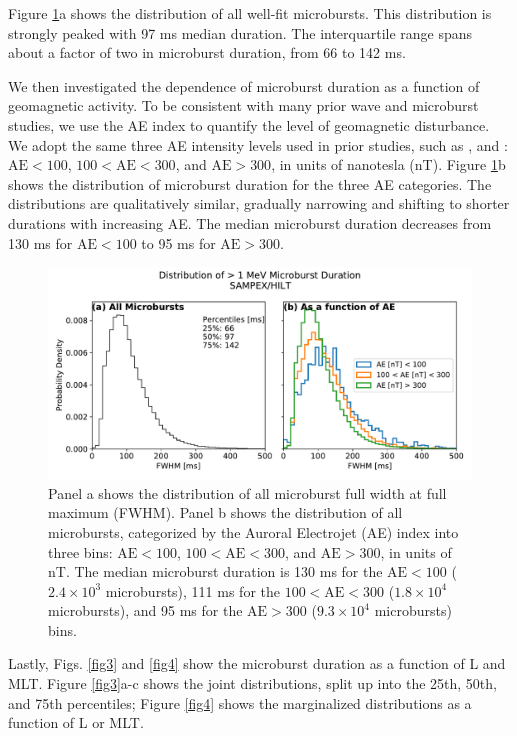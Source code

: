 \documentclass[draft]{agujournal2019}
\begin{document}
Figure \ref{fig2}a shows the distribution of all well-fit microbursts. This distribution is strongly peaked with 97 ms median duration. The interquartile range spans about a factor of two in microburst duration, from 66 to 142 ms.

We then investigated the dependence of microburst duration as a function of geomagnetic activity. To be consistent with many prior wave and microburst studies, we use the AE index to quantify the level of geomagnetic disturbance. We adopt the same three AE intensity levels used in prior studies, such as , and : $\mathrm{AE} < 100$, $100 < \mathrm{AE} < 300$, and $\mathrm{AE} > 300$, in units of nanotesla (nT). Figure \ref{fig2}b shows the distribution of microburst duration for the three AE categories. The distributions are qualitatively similar, gradually narrowing and shifting to shorter durations with increasing AE. The median microburst duration decreases from 130 ms for $\mathrm{AE} < 100$ to 95 ms for $ \mathrm{AE} > 300$.

\begin{figure}
\noindent\includegraphics[width=\textwidth]{figures/fig2.pdf}
\caption{Panel a shows the distribution of all microburst full width at full maximum (FWHM). Panel b shows the distribution of all microbursts, categorized by the Auroral Electrojet (AE) index into three bins: $\mathrm{AE} < 100$, $100 < \mathrm{AE} < 300$, and $\mathrm{AE} > 300$, in units of nT. The median microburst duration is 130 ms for the $\mathrm{AE} < 100$ ($2.4\times 10^{3}$ microbursts), 111 ms for the $100 < \mathrm{AE} < 300$ ($1.8\times 10^{4}$ microbursts), and 95 ms for the $ \mathrm{AE} > 300$ ($9.3\times 10^{4}$ microbursts) bins.}
\label{fig2}
\end{figure}

Lastly, Figs. \ref{fig3} and \ref{fig4} show the microburst duration as a function of L and MLT. Figure \ref{fig3}a-c shows the joint distributions, split up into the 25th, 50th, and 75th percentiles; Figure \ref{fig4} shows the marginalized distributions as a function of L or MLT.
\end{document}
